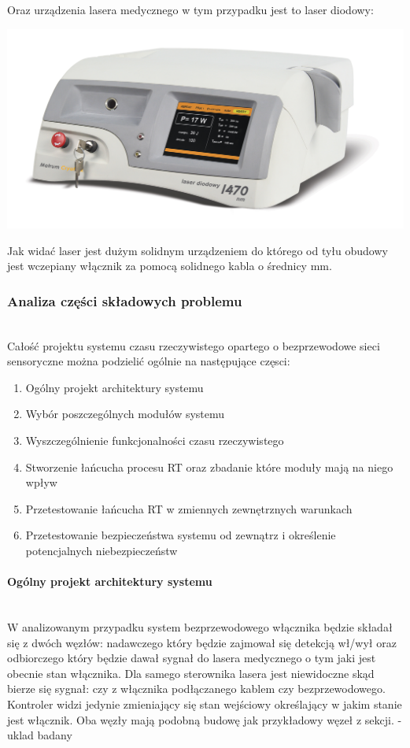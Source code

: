 Oraz urządzenia lasera medycznego w tym przypadku jest to laser diodowy:

\centerline{\includegraphics[scale=0.20]{./img/target_system/D1470_laser.jpg}} 

Jak widać laser jest dużym solidnym urządzeniem do którego od tyłu obudowy jest wczepiany włącznik za pomocą solidnego kabla o średnicy  mm. \\

\subsubsection{Analiza części składowych problemu} \mbox{}\\

Całość projektu systemu czasu rzeczywistego opartego o bezprzewodowe sieci sensoryczne można podzielić ogólnie na następujące częsci: \\

\begin{enumerate}
\item Ogólny projekt architektury systemu 
\item Wybór poszczególnych modułów systemu
\item Wyszczególnienie funkcjonalności czasu rzeczywistego
\item Stworzenie łańcucha procesu RT oraz zbadanie które moduły mają na niego wpływ
\item Przetestowanie łańcucha RT w zmiennych zewnętrznych warunkach 
\item Przetestowanie bezpieczeństwa systemu od zewnątrz i określenie potencjalnych niebezpieczeństw
\end{enumerate}

\paragraph{Ogólny projekt architektury systemu}\mbox{}\\
\tab W analizowanym przypadku system bezprzewodowego włącznika będzie składał się z dwóch węzłów: nadawczego który będzie zajmował się detekcją wł/wył oraz odbiorczego który będzie dawał sygnał do lasera medycznego o tym jaki jest obecnie stan włącznika.
Dla samego sterownika lasera jest niewidoczne skąd bierze się sygnał: czy z włącznika podłączanego kablem czy bezprzewodowego. Kontroler widzi jedynie zmieniający się stan wejściowy określający w jakim stanie jest włącznik.
\tab Oba węzły mają podobną budowę jak przykładowy węzeł z sekcji. -uklad badany

